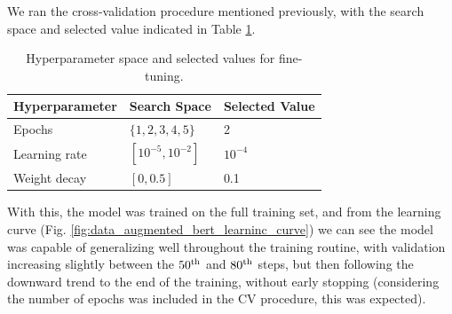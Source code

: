 \documentclass[conference]{IEEEtran}
\begin{document}








We ran the cross-validation procedure mentioned previously, with the search space and selected value indicated in Table \ref{parameters_basebert}.

\begin{table}[H]
\centering
\caption{Hyperparameter space and selected values for fine-tuning.}
\label{parameters_basebert}
\begin{tabular}{lll}
\toprule
\textbf{Hyperparameter} & \textbf{Search Space} & \textbf{Selected Value} \\
\midrule
Epochs & $\{1,2,3,4,5\}$ & 2 \\
Learning rate & $[10^{-5}, 10^{-2}]$ & $10^{-4}$ \\
Weight decay & $[0, 0.5]$ & 0.1 \\
\bottomrule
\end{tabular}
\end{table}





With this, the model was trained on the full training set, and from the learning curve (Fig. \ref{fig:data_augmented_bert_learninc_curve}) we can see the model was capable of generalizing well throughout the training routine, with validation increasing slightly between the $50^{\textnormal{th}}$ and $80^{\textnormal{th}}$ steps, but then following the downward trend to the end of the training, without early stopping (considering the number of epochs was included in the CV procedure, this was expected).
\end{document}
